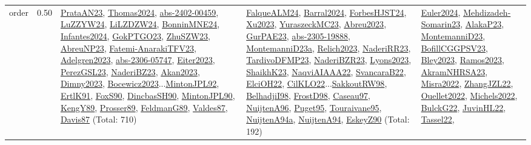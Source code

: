 {\begin{longtable}{p{3cm}r>{\raggedright\arraybackslash}p{6cm}>{\raggedright\arraybackslash}p{6cm}>{\raggedright\arraybackslash}p{8cm}}
\index{order}\index{Scheduling!order}order &  0.50 & \hyperref[detail:PrataAN23]{PrataAN23}, \hyperref[detail:Thomas2024]{Thomas2024}, \hyperref[detail:abs-2402-00459]{abs-2402-00459}, \hyperref[detail:LuZZYW24]{LuZZYW24}, \hyperref[detail:LiLZDZW24]{LiLZDZW24}, \hyperref[detail:BonninMNE24]{BonninMNE24}, \hyperref[detail:Infantes2024]{Infantes2024}, \hyperref[detail:GokPTGO23]{GokPTGO23}, \hyperref[detail:ZhuSZW23]{ZhuSZW23}, \hyperref[detail:AbreuNP23]{AbreuNP23}, \hyperref[detail:Fatemi-AnarakiTFV23]{Fatemi-AnarakiTFV23}, \hyperref[detail:Adelgren2023]{Adelgren2023}, \hyperref[detail:abs-2306-05747]{abs-2306-05747}, \hyperref[detail:Eiter2023]{Eiter2023}, \hyperref[detail:PerezGSL23]{PerezGSL23}, \hyperref[detail:NaderiBZ23]{NaderiBZ23}, \hyperref[detail:Akan2023]{Akan2023}, \hyperref[detail:Dimny2023]{Dimny2023}, \hyperref[detail:Bocewicz2023]{Bocewicz2023}...\hyperref[detail:MintonJPL92]{MintonJPL92}, \hyperref[detail:ErtlK91]{ErtlK91}, \hyperref[detail:FoxS90]{FoxS90}, \hyperref[detail:DincbasSH90]{DincbasSH90}, \hyperref[detail:MintonJPL90]{MintonJPL90}, \hyperref[detail:KengY89]{KengY89}, \hyperref[detail:Prosser89]{Prosser89}, \hyperref[detail:FeldmanG89]{FeldmanG89}, \hyperref[detail:Valdes87]{Valdes87}, \hyperref[detail:Davis87]{Davis87} (Total: 710) & \hyperref[detail:FalqueALM24]{FalqueALM24}, \hyperref[detail:Barral2024]{Barral2024}, \hyperref[detail:ForbesHJST24]{ForbesHJST24}, \hyperref[detail:Xu2023]{Xu2023}, \hyperref[detail:YuraszeckMC23]{YuraszeckMC23}, \hyperref[detail:Abreu2023]{Abreu2023}, \hyperref[detail:GurPAE23]{GurPAE23}, \hyperref[detail:abs-2305-19888]{abs-2305-19888}, \hyperref[detail:MontemanniD23a]{MontemanniD23a}, \hyperref[detail:Relich2023]{Relich2023}, \hyperref[detail:NaderiRR23]{NaderiRR23}, \hyperref[detail:TardivoDFMP23]{TardivoDFMP23}, \hyperref[detail:NaderiBZR23]{NaderiBZR23}, \hyperref[detail:Lyons2023]{Lyons2023}, \hyperref[detail:ShaikhK23]{ShaikhK23}, \hyperref[detail:NaqviAIAAA22]{NaqviAIAAA22}, \hyperref[detail:SvancaraB22]{SvancaraB22}, \hyperref[detail:ElciOH22]{ElciOH22}, \hyperref[detail:CilKLO22]{CilKLO22}...\hyperref[detail:SakkoutRW98]{SakkoutRW98}, \hyperref[detail:BelhadjiI98]{BelhadjiI98}, \hyperref[detail:FrostD98]{FrostD98}, \hyperref[detail:Caseau97]{Caseau97}, \hyperref[detail:NuijtenA96]{NuijtenA96}, \hyperref[detail:Puget95]{Puget95}, \hyperref[detail:Touraivane95]{Touraivane95}, \hyperref[detail:NuijtenA94a]{NuijtenA94a}, \hyperref[detail:NuijtenA94]{NuijtenA94}, \hyperref[detail:EskeyZ90]{EskeyZ90} (Total: 192) & \hyperref[detail:Euler2024]{Euler2024}, \hyperref[detail:Mehdizadeh-Somarin23]{Mehdizadeh-Somarin23}, \hyperref[detail:AlakaP23]{AlakaP23}, \hyperref[detail:MontemanniD23]{MontemanniD23}, \hyperref[detail:BofillCGGPSV23]{BofillCGGPSV23}, \hyperref[detail:Bley2023]{Bley2023}, \hyperref[detail:Ramos2023]{Ramos2023}, \hyperref[detail:AkramNHRSA23]{AkramNHRSA23}, \hyperref[detail:Misra2022]{Misra2022}, \hyperref[detail:ZhangJZL22]{ZhangJZL22}, \hyperref[detail:Ouellet2022]{Ouellet2022}, \hyperref[detail:Michels2022]{Michels2022}, \hyperref[detail:BulckG22]{BulckG22}, \hyperref[detail:JuvinHL22]{JuvinHL22}, \hyperref[detail:Tassel22]{Tassel22}, 
\end{longtable}}
